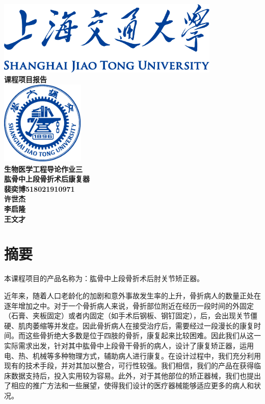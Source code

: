 \documentclass[UTF8]{ctexart}
\begin{document}
\begin{titlepage}
    \begin{center}
        \includegraphics[width=0.8\textwidth]{sjtu-name-blue.pdf}\\[1cm]
        \textsc{\huge \bfseries 课程项目报告}\\[1.5cm]
        \includegraphics[width=0.3\textwidth]{sjtu-badge-blue.pdf}\\[1cm]    
        \textsc{\huge \bfseries 生物医学工程导论作业三}\\[1.5cm]


        \Huge \bfseries{肱骨中上段骨折术后康复器}\\[1cm]
            
        \Large \bfseries{裴奕博518021910971\\许世杰\\李启隆\\王文才\\}

    \end{center}
\end{titlepage}


\section{摘要}
    本课程项目的产品名称为：肱骨中上段骨折术后肘关节矫正器。

    近年来，随着人口老龄化的加剧和意外事故发生率的上升，骨折病人的数量正处在逐年增加之中。对于一个骨折病人来说，骨折部位附近在经历一段时间的外固定（石膏、夹板固定）或者内固定（如手术后钢板、钢钉固定），后，会出现关节僵硬、肌肉萎缩等并发症。因此骨折病人在接受治疗后，需要经过一段漫长的康复时间。而这些骨折绝大多数是位于四肢的骨折，康复起来比较困难。因此我们从这一实际需求出发，针对其中肱骨中上段骨干骨折的病人，设计了康复矫正器，运用电、热、机械等多种物理方式，辅助病人进行康复。在设计过程中，我们充分利用现有的技术手段，并对其加以整合，可行性较强。我们相信，我们的产品在获得临床数据支持后，投入实用较为容易。此外，对于其他部位的矫正器械，我们也提出了相应的推广方法和一些展望，使得我们设计的医疗器械能够适应更多的病人和状况。
\newpage
\end{document}
